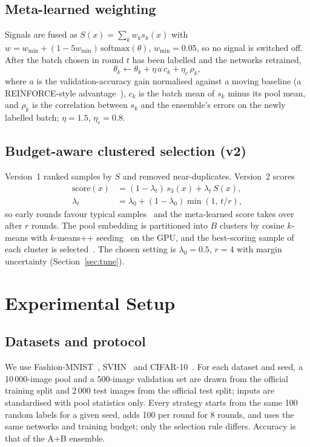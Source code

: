 \documentclass[conference,a4paper]{IEEEtran}
\begin{document}
\subsection{Meta-learned weighting}
Signals are fused as $S(x)=\sum_k w_k s_k(x)$ with $w = w_{\min} + (1-5w_{\min})\,\mathrm{softmax}(\theta)$,
$w_{\min}=0.05$, so no signal is switched off. After the batch chosen in round $t$ has been labelled and the networks
retrained,
\begin{equation}
\theta_k \leftarrow \theta_k + \eta\, a\, c_k + \eta_c\, \rho_k ,
\end{equation}
where $a$ is the validation-accuracy gain normalised against a moving baseline (a REINFORCE-style
advantage~\cite{williams1992}), $c_k$ is the batch mean of $s_k$ minus its pool mean, and $\rho_k$ is the correlation
between $s_k$ and the ensemble's errors on the newly labelled batch; $\eta=1.5$, $\eta_c=0.8$.

\subsection{Budget-aware clustered selection (v2)}
Version~1 ranked samples by $S$ and removed near-duplicates. Version~2 scores
\begin{align}
\mathrm{score}(x) &= (1-\lambda_t)\,s_3(x)+\lambda_t\,S(x), \\
\lambda_t &= \lambda_0+(1-\lambda_0)\min(1,\,t/r),
\end{align}
so early rounds favour typical samples~\cite{hacohen2022} and the meta-learned score takes over after $r$ rounds. The
pool embedding is partitioned into $B$ clusters by cosine $k$-means with $k$-means++ seeding~\cite{arthur2007} on the
GPU, and the best-scoring sample of each cluster is selected~\cite{nguyen2004}. The chosen setting is
$\lambda_0=0.5$, $r=4$ with margin uncertainty (Section~\ref{sec:tune}).

\section{Experimental Setup}
\subsection{Datasets and protocol}
We use Fashion-MNIST~\cite{xiao2017}, SVHN~\cite{netzer2011} and CIFAR-10~\cite{krizhevsky2009}. For each dataset and
seed, a 10\,000-image pool and a 500-image validation set are drawn from the official training split and 2\,000 test
images from the official test split; inputs are standardised with pool statistics only. Every strategy starts from
the same 100 random labels for a given seed, adds 100 per round for 8 rounds, and uses the
same networks and training budget; only the selection rule differs. Accuracy is that of the A+B ensemble.
\end{document}

